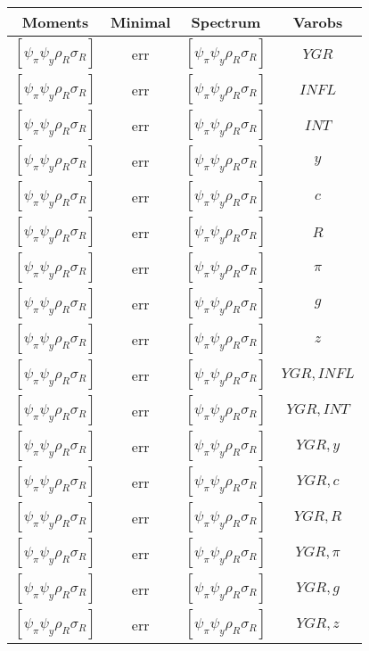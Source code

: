 \documentclass[a4paper,10pt]{article}
\begin{document}
\centering
\begin{longtable}{|c|c|c|c|}
\hline
Moments & Minimal & Spectrum & Varobs \\
\hline
$[\psi_\pi \psi_y \rho_R \sigma_R ]$ & err & $[\psi_\pi \psi_y \rho_R \sigma_R ]$ & ${YGR}$ \\
\hline
$[\psi_\pi \psi_y \rho_R \sigma_R ]$ & err & $[\psi_\pi \psi_y \rho_R \sigma_R ]$ & ${INFL}$ \\
\hline
$[\psi_\pi \psi_y \rho_R \sigma_R ]$ & err & $[\psi_\pi \psi_y \rho_R \sigma_R ]$ & ${INT}$ \\
\hline
$[\psi_\pi \psi_y \rho_R \sigma_R ]$ & err & $[\psi_\pi \psi_y \rho_R \sigma_R ]$ & ${y}$ \\
\hline
$[\psi_\pi \psi_y \rho_R \sigma_R ]$ & err & $[\psi_\pi \psi_y \rho_R \sigma_R ]$ & ${c}$ \\
\hline
$[\psi_\pi \psi_y \rho_R \sigma_R ]$ & err & $[\psi_\pi \psi_y \rho_R \sigma_R ]$ & ${R}$ \\
\hline
$[\psi_\pi \psi_y \rho_R \sigma_R ]$ & err & $[\psi_\pi \psi_y \rho_R \sigma_R ]$ & ${\pi}$ \\
\hline
$[\psi_\pi \psi_y \rho_R \sigma_R ]$ & err & $[\psi_\pi \psi_y \rho_R \sigma_R ]$ & ${g}$ \\
\hline
$[\psi_\pi \psi_y \rho_R \sigma_R ]$ & err & $[\psi_\pi \psi_y \rho_R \sigma_R ]$ & ${z}$ \\
\hline
$[\psi_\pi \psi_y \rho_R \sigma_R ]$ & err & $[\psi_\pi \psi_y \rho_R \sigma_R ]$ & ${YGR},{INFL}$ \\
\hline
$[\psi_\pi \psi_y \rho_R \sigma_R ]$ & err & $[\psi_\pi \psi_y \rho_R \sigma_R ]$ & ${YGR},{INT}$ \\
\hline
$[\psi_\pi \psi_y \rho_R \sigma_R ]$ & err & $[\psi_\pi \psi_y \rho_R \sigma_R ]$ & ${YGR},{y}$ \\
\hline
$[\psi_\pi \psi_y \rho_R \sigma_R ]$ & err & $[\psi_\pi \psi_y \rho_R \sigma_R ]$ & ${YGR},{c}$ \\
\hline
$[\psi_\pi \psi_y \rho_R \sigma_R ]$ & err & $[\psi_\pi \psi_y \rho_R \sigma_R ]$ & ${YGR},{R}$ \\
\hline
$[\psi_\pi \psi_y \rho_R \sigma_R ]$ & err & $[\psi_\pi \psi_y \rho_R \sigma_R ]$ & ${YGR},{\pi}$ \\
\hline
$[\psi_\pi \psi_y \rho_R \sigma_R ]$ & err & $[\psi_\pi \psi_y \rho_R \sigma_R ]$ & ${YGR},{g}$ \\
\hline
$[\psi_\pi \psi_y \rho_R \sigma_R ]$ & err & $[\psi_\pi \psi_y \rho_R \sigma_R ]$ & ${YGR},{z}$ \\

\end{longtable}
\end{document}
